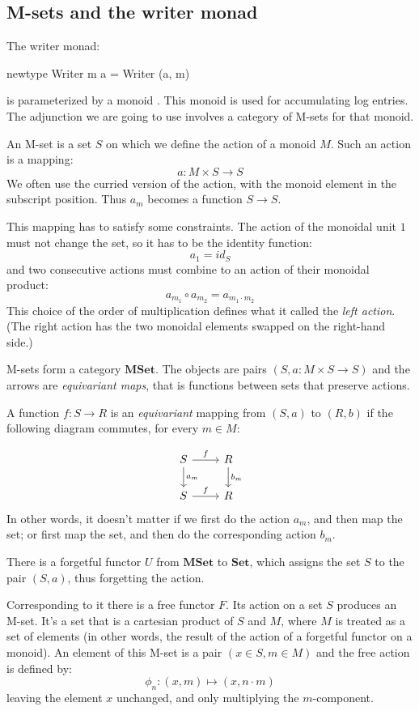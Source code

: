 \documentclass[DaoFP]{subfiles}
\begin{document}
\subsection{M-sets and the writer monad}

The writer monad:
\begin{haskell}
newtype Writer m a = Writer (a, m)
\end{haskell}
is parameterized by a monoid . This monoid is used for accumulating log entries. The adjunction we are going to use involves a category of M-sets for that monoid. 

An M-set is a set $S$ on which we define the action of a monoid $M$. Such an action is a mapping:
\[a \colon M \times S \to S \]
We often use the curried version of the action, with the monoid element in the subscript position. Thus $a_m$ becomes a function $S \to S$. 

This mapping has to satisfy some constraints. The action of the monoidal unit $1$ must not change the set, so it has to be the identity function:
\[ a_1 = id_S \]
and two consecutive actions must combine to an action of their monoidal product:
\[ a_{m_1} \circ a_{m_2} = a_{m_1 \cdot m_2} \]
This choice of the order of multiplication defines what it called the \emph{left action}. (The right action has the two monoidal elements swapped on the right-hand side.)

M-sets form a category $\mathbf{MSet}$. The objects are pairs $(S, a\colon M\times S \to S)$ and the arrows are  \emph{equivariant maps}, that is  functions between sets that preserve actions. 

A function $f \colon S \to R$ is an \emph{equivariant} mapping from $(S, a)$ to $(R, b)$ if the following diagram commutes, for every $m \in M$:

\[
 \begin{tikzcd}
 S 
 \arrow[r, "f"]
 \arrow[d, "a_m"]
 & R
\arrow[d, "b_m"]
 \\
S
 \arrow[r, "f"]
 & R
  \end{tikzcd}
\]
In other words, it doesn't matter if we first do the action $a_m$, and then map the set; or first map the set, and then do the corresponding action $b_m$.

There is a forgetful functor $U$ from $\mathbf{MSet}$ to $\mathbf{Set}$, which assigns the set $S$ to the pair $(S, a)$, thus forgetting the action.  

Corresponding to it there is a free functor $F$. Its action on a set $S$ produces an M-set. It's a set that is a cartesian product of $S$ and $M$, where $M$ is treated as a set of elements (in other words, the result of the action of a forgetful functor on a monoid). An element of this M-set is a pair $(x \in S, m \in M)$ and the free action is defined by:
\[ \phi_n \colon (x, m) \mapsto (x, n \cdot m) \]
leaving the element $x$ unchanged, and only multiplying the $m$-component.
\end{document}
